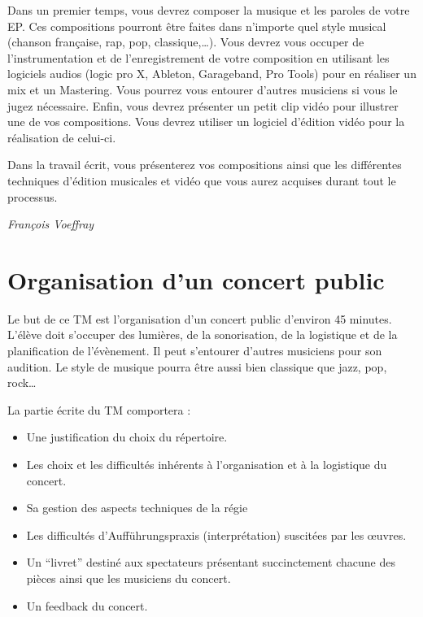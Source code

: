 \documentclass[
  10pt,
  french,
  a5paper,
  openany]{book}
\providecommand{\tightlist}{%
  \setlength{\itemsep}{0pt}\setlength{\parskip}{0pt}}
\newenvironment{signature}{\begin{flushright}}{\end{flushright}}
\begin{document}
Dans un premier temps, vous devrez composer la musique et les paroles de votre EP. Ces compositions pourront être faites dans n'importe quel style musical (chanson française, rap, pop, classique,\ldots). Vous devrez vous occuper de l'instrumentation et de l'enregistrement de votre composition en utilisant les logiciels audios (logic pro X, Ableton, Garageband, Pro Tools) pour en réaliser un mix et un Mastering. Vous pourrez vous entourer d'autres musiciens si vous le jugez nécessaire. Enfin, vous devrez présenter un petit clip vidéo pour illustrer une de vos compositions. Vous devrez utiliser un logiciel d'édition vidéo pour la réalisation de celui-ci.

Dans la travail écrit, vous présenterez vos compositions ainsi que les différentes techniques d'édition musicales et vidéo que vous aurez acquises durant tout le processus.

\begin{signature}
\emph{François Voeffray}

\end{signature}

\hypertarget{organisation-dun-concert-public}{%
\chapter{Organisation d'un concert public}\label{organisation-dun-concert-public}}

Le but de ce TM est l'organisation d'un concert public d'environ 45 minutes. L'élève doit s'occuper des lumières, de la sonorisation, de la logistique et de la planification de l'évènement. Il peut s'entourer d'autres musiciens pour son audition. Le style de musique pourra être aussi bien classique que jazz, pop, rock\ldots{}

La partie écrite du TM comportera :

\begin{itemize}
\tightlist
\item
  Une justification du choix du répertoire.
\item
  Les choix et les difficultés inhérents à l'organisation et à la logistique du concert.
\item
  Sa gestion des aspects techniques de la régie
\item
  Les difficultés d'Aufführungspraxis (interprétation) suscitées par les œuvres.
\item
  Un ``livret'' destiné aux spectateurs présentant succinctement chacune des pièces ainsi que les musiciens du concert.
\item
  Un feedback du concert.
\end{itemize}
\end{document}
